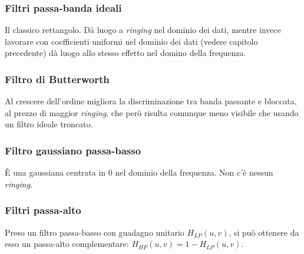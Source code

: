 \documentclass[a4paper,11pt]{article}
\begin{document}
\subsubsection{Filtri passa-banda ideali}
Il classico rettangolo. Dà luogo a \textit{ringing} nel dominio dei dati, mentre invece lavorare con coefficienti uniformi nel dominio dei dati
(vedere capitolo precedente) dà luogo allo stesso effetto nel domino della frequenza.

\subsubsection{Filtro di Butterworth}
Al crescere dell'ordine migliora la discriminazione tra banda passante e bloccata, al prezzo di maggior \textit{ringing}, che però risulta comunque
meno visibile che usando un filtro ideale troncato.

\subsubsection{Filtro gaussiano passa-basso}
È una gaussiana centrata in 0 nel dominio della frequenza. Non c'è nessun \textit{ringing}.

\subsubsection{Filtri passa-alto}
Preso un filtro passa-basso con guadagno unitario $H_{LP}(u,v)$, si può ottenere da esso un passa-alto complementare: $H_{HP}(u,v)=1 - H_{LP}(u,v)$.
\end{document}
